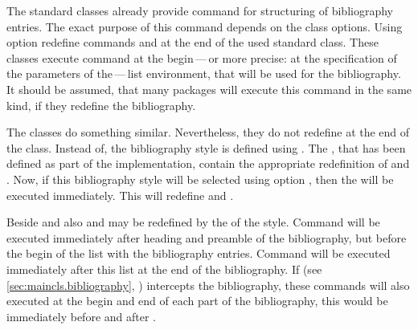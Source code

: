 
\begin{Declaration}
\end{Declaration}
The standard classes already provide command
 for structuring of bibliography entries. The exact purpose of
this command depends on the class options. Using option
 redefine commands
 and  at the end of the used standard
class. These classes execute command  at the
begin\,---\,or more precise: at the specification of the parameters of
the\,---\,list environment, that will be used for the bibliography. It should
be assumed, that many packages will execute this command in the same kind, if
they redefine the bibliography.

The \KOMAScript{} classes do something similar. Nevertheless, they do not
redefine  at the end of the class. Instead of, the
bibliography style  is defined using
. The , that has been defined as part
of the implementation, contain the appropriate redefinition of
 and . Now, if this bibliography style
will be selected using option
%
%
, then the
 will be executed immediately. This will redefine
 and .

Beside  and  also 
and  may be redefined by the  of the
style. Command  will be executed immediately after
heading and preamble of the bibliography, but before the begin of the list
with the bibliography entries. Command  will be executed
immediately after this list at the end of the bibliography. If
 (see
\autoref{sec:maincls.bibliography},
) intercepts the bibliography,
these commands will also executed at the begin and end of each part of the
bibliography, this would be immediately before and after
.

